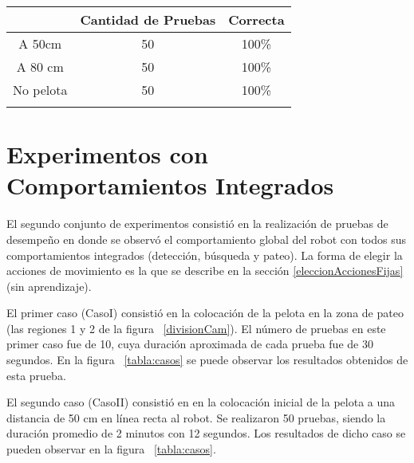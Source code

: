 \begin{tabular}{|c|c|c|}
 \hline 
  & Cantidad de Pruebas & Correcta \\ 
 \hline 
 A 50cm & 50 & 100\% \\ 
 \hline 
 A 80 cm & 50 & 100\% \\ 
 \hline 
 No pelota & 50 & 100\% \\ 
 
 \hline 
\label{tabla:deteccion} 
 \end{tabular}  
\section{Experimentos con Comportamientos Integrados}
\label{sec:experimentosintegrados}

El segundo conjunto de experimentos consistió en la realización de pruebas de desempeño en donde se observó el comportamiento global del robot con todos sus comportamientos integrados (detección, búsqueda y pateo). La forma de elegir la acciones de movimiento es la que se describe en la sección \ref{eleccionAccionesFijas} (sin aprendizaje). 

El  primer caso (CasoI) consistió en la colocación de la pelota en la zona de pateo (las regiones 1 y 2 de la figura ~\ref{divisionCam}). El número de pruebas en este primer caso fue de 10, cuya duración aproximada de cada prueba fue de 30 segundos. En la figura ~\ref{tabla:casos} se puede observar los resultados obtenidos de esta prueba.


El segundo caso (CasoII) consistió en en la colocación inicial de la pelota a una distancia de 50 cm en línea recta al robot. Se realizaron 50 pruebas, siendo la duración promedio de 2 minutos con 12 segundos. Los resultados de dicho caso se pueden observar en la figura ~\ref{tabla:casos}. 


